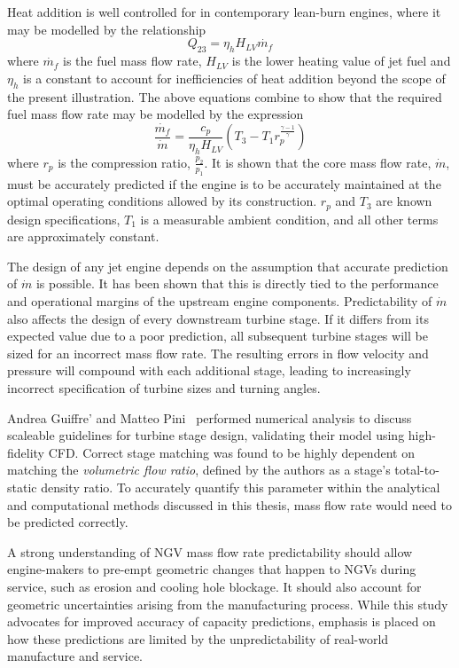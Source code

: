 \documentclass[a4paper, 11pt, oneside]{report}
\begin{document}
Heat addition is well controlled for in contemporary lean-burn engines, where it may be modelled by the relationship
\begin{equation}
	Q_{23} = 
	\eta_h
	H_{LV}
	\dot{m_f}
\end{equation}
where $\dot{m_f}$ is the fuel mass flow rate, $H_{LV}$ is the lower heating value of jet fuel and $\eta_h$ is a constant to account for inefficiencies of heat addition beyond the scope of the present illustration. The above equations combine to show that the required fuel mass flow rate may be modelled by the expression
\begin{equation}
	\frac{\dot{m_f}}{\dot{m}}
	=
	\frac{c_p}{\eta_{h}H_{LV}}
	\left(
		T_3 - 
		T_1
		r_p
		^
		\frac{\gamma-1}{\gamma}
	\right)
\end{equation}
where $r_p$ is the compression ratio, $\frac{p_2}{p_1}$. It is shown that the core mass flow rate, $\dot{m}$, must be accurately predicted if the engine is to be accurately maintained at the optimal operating conditions allowed by its construction. $r_p$ and $T_3$ are known design specifications, $T_1$ is a measurable ambient condition, and all other terms are approximately constant. 

The design of any jet engine depends on the assumption that accurate prediction of $\dot{m}$ is possible. It has been shown that this is directly tied to the performance and operational margins of the upstream engine components. Predictability of $\dot{m}$ also affects the design of every downstream turbine stage. If it differs from its expected value due to a poor prediction, all subsequent turbine stages will be sized for an incorrect mass flow rate. The resulting errors in flow velocity and pressure will compound with each additional stage, leading to increasingly incorrect specification of turbine sizes and turning angles.

Andrea Guiffre' and Matteo Pini~\cite{guiffre_design_guidelines} performed numerical analysis to discuss scaleable guidelines for turbine stage design, validating their model using high-fidelity CFD.  Correct stage matching was found to be highly dependent on matching the \textit{volumetric flow ratio}, defined by the authors as a stage's total-to-static density ratio. To accurately quantify this parameter within the analytical and computational methods discussed in this thesis, mass flow rate would need to be predicted correctly.

A strong understanding of NGV mass flow rate predictability should allow engine-makers to pre-empt geometric changes that happen to NGVs during service, such as erosion and cooling hole blockage. It should also account for geometric uncertainties arising from the manufacturing process. While this study advocates for improved accuracy of capacity predictions, emphasis is placed on how these predictions are limited by the unpredictability of real-world manufacture and service.
\end{document}
